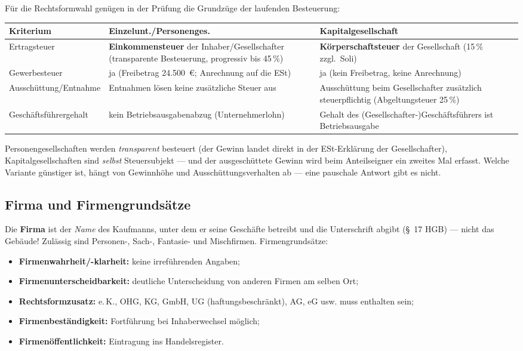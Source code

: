 \documentclass[11pt, a4paper]{article}
\begin{document}
Für die Rechtsformwahl genügen in der Prüfung die Grundzüge der laufenden Besteuerung:

\begin{center}
\small
\begin{tabular}{p{4.2cm} p{5.0cm} p{5.0cm}}
\toprule
\rowcolor{bfwTabHead}\textbf{Kriterium} & \textbf{Einzelunt./Personenges.} & \textbf{Kapitalgesellschaft}\\
\midrule
Ertragsteuer & \textbf{Einkommensteuer} der Inhaber/Gesellschafter (transparente Besteuerung, progressiv bis 45\,\%) & \textbf{Körperschaftsteuer} der Gesellschaft (15\,\% zzgl.\ Soli)\\
\addlinespace
Gewerbesteuer & ja (Freibetrag 24.500~€; Anrechnung auf die ESt) & ja (kein Freibetrag, keine Anrechnung)\\
\addlinespace
Ausschüttung/Entnahme & Entnahmen lösen keine zusätzliche Steuer aus & Ausschüttung beim Gesellschafter zusätzlich steuerpflichtig (Abgeltungsteuer 25\,\%)\\
\addlinespace
Geschäftsführergehalt & kein Betriebsausgabenabzug (Unternehmerlohn) & Gehalt des (Gesellschafter-)Geschäftsführers ist Betriebsausgabe\\
\bottomrule
\end{tabular}
\end{center}

\begin{merksatz}
Personengesellschaften werden \emph{transparent} besteuert (der Gewinn landet direkt in
der ESt-Erklärung der Gesellschafter), Kapitalgesellschaften sind \emph{selbst}
Steuersubjekt --- und der ausgeschüttete Gewinn wird beim Anteilseigner ein zweites Mal
erfasst. Welche Variante günstiger ist, hängt von Gewinnhöhe und Ausschüttungsverhalten
ab --- eine pauschale Antwort gibt es nicht.
\end{merksatz}

\subsection{Firma und Firmengrundsätze}

Die \textbf{Firma} ist der \emph{Name} des Kaufmanns, unter dem er seine Geschäfte
betreibt und die Unterschrift abgibt (§~17 HGB) --- nicht das Gebäude! Zulässig sind
Personen-, Sach-, Fantasie- und Mischfirmen. Firmengrundsätze:

\begin{itemize}
  \item \textbf{Firmenwahrheit/-klarheit:} keine irreführenden Angaben;
  \item \textbf{Firmenunterscheidbarkeit:} deutliche Unterscheidung von anderen Firmen
    am selben Ort;
  \item \textbf{Rechtsformzusatz:} e.\,K., OHG, KG, GmbH, UG (haftungsbeschränkt), AG,
    eG usw. muss enthalten sein;
  \item \textbf{Firmenbeständigkeit:} Fortführung bei Inhaberwechsel möglich;
  \item \textbf{Firmenöffentlichkeit:} Eintragung ins Handelsregister.
\end{itemize}
\end{document}
